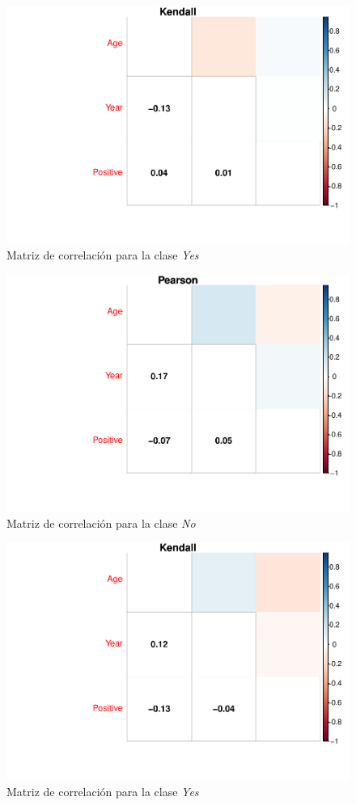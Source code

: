 \begin{figure}[H]\center\includegraphics[width=.9\linewidth]{img/Clasificacion_files/figure-latex/unnamed-chunk-25-2}\caption{Matriz de correlación para la clase \textit{Yes}}\end{figure}

\begin{figure}[H]\center\includegraphics[width=.9\linewidth]{img/Clasificacion_files/figure-latex/unnamed-chunk-26-1}\caption{Matriz de correlación para la clase \textit{No}}\end{figure}

\begin{figure}[H]\center\includegraphics[width=.9\linewidth]{img/Clasificacion_files/figure-latex/unnamed-chunk-26-2}\caption{Matriz de correlación para la clase \textit{Yes}}\end{figure}

